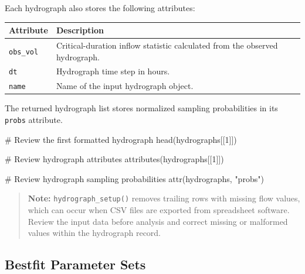 \documentclass[
  letterpaper,
  DIV=11,
  numbers=noendperiod]{scrreprt}
\newenvironment{Shaded}{\begin{snugshade}}{\end{snugshade}}
\newcommand{\CommentTok}[1]{\textcolor[rgb]{0.37,0.37,0.37}{#1}}
\newcommand{\DecValTok}[1]{\textcolor[rgb]{0.68,0.00,0.00}{#1}}
\newcommand{\FunctionTok}[1]{\textcolor[rgb]{0.28,0.35,0.67}{#1}}
\newcommand{\NormalTok}[1]{\textcolor[rgb]{0.00,0.23,0.31}{#1}}
\newcommand{\StringTok}[1]{\textcolor[rgb]{0.13,0.47,0.30}{#1}}
\newcounter{none} %
\begin{document}
Each hydrograph also stores the following attributes:

{\def\LTcaptype{none} %
\begin{longtable}[]{@{}
  >{\raggedright\arraybackslash}p{}
  >{\raggedright\arraybackslash}p{}@{}}
\toprule\noalign{}
\begin{minipage}[b]{\linewidth}\raggedright
Attribute
\end{minipage} & \begin{minipage}[b]{\linewidth}\raggedright
Description
\end{minipage} \\
\midrule\noalign{}
\endhead
\bottomrule\noalign{}
\endlastfoot
\texttt{obs\_vol} & Critical-duration inflow statistic calculated from
the observed hydrograph. \\
\texttt{dt} & Hydrograph time step in hours. \\
\texttt{name} & Name of the input hydrograph object. \\
\end{longtable}
}

The returned hydrograph list stores normalized sampling probabilities in
its \texttt{probs} attribute.

\begin{Shaded}
\begin{Highlighting}[]
\CommentTok{\# Review the first formatted hydrograph}
\FunctionTok{head}\NormalTok{(hydrographs[[}\DecValTok{1}\NormalTok{]])}

\CommentTok{\# Review hydrograph attributes}
\FunctionTok{attributes}\NormalTok{(hydrographs[[}\DecValTok{1}\NormalTok{]])}

\CommentTok{\# Review hydrograph sampling probabilities}
\FunctionTok{attr}\NormalTok{(hydrographs, }\StringTok{"probs"}\NormalTok{)}
\end{Highlighting}
\end{Shaded}

\begin{quote}
\textbf{Note:} \texttt{hydrograph\_setup()} removes trailing rows with
missing flow values, which can occur when CSV files are exported from
spreadsheet software. Review the input data before analysis and correct
missing or malformed values within the hydrograph record.
\end{quote}

\subsection{Bestfit Parameter Sets}\label{bestfit-parameter-sets}
\end{document}
